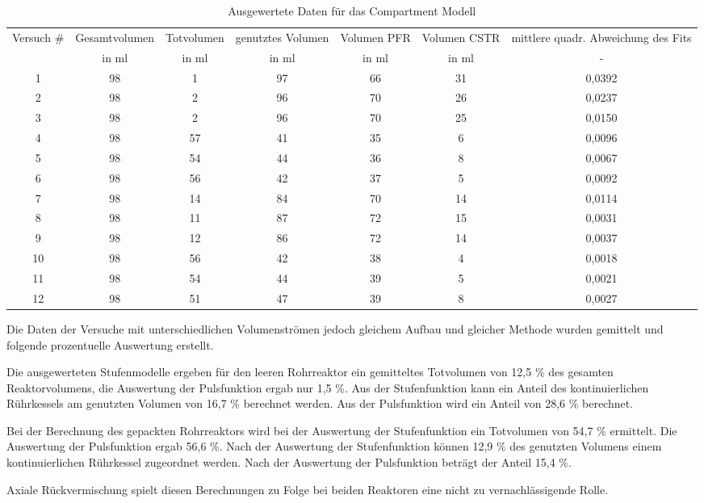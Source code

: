 \documentclass[12pt,liststotoc]{report}
\begin{document}
\begin{landscape}

\begin{table}[C]
\centering
\caption{Ausgewertete Daten für das Compartment Modell}
\begin{tabular}{ccccccc}
\toprule 
Versuch $\#$ & Gesamtvolumen & Totvolumen & genutztes Volumen & Volumen PFR & Volumen CSTR & mittlere quadr. Abweichung des Fits \\
& in ml & in  ml & in ml & in ml & in ml & -\\
\midrule
1 & 98 & 1 & 97 & 66 & 31 & 0,0392 \\
2 & 98 & 2 & 96 & 70 & 26 & 0,0237 \\
3 & 98 & 2 & 96 & 70 & 25 & 0,0150\\
4 & 98 & 57 & 41 & 35 & 6 & 0,0096\\
5 & 98 & 54 & 44 & 36 & 8 & 0,0067\\
6 & 98 & 56 & 42 & 37 & 5 & 0,0092\\
7 & 98 & 14 & 84 & 70 & 14 & 0,0114\\
8 & 98 & 11 & 87 & 72 & 15 & 0,0031\\
9 & 98 & 12 & 86 & 72 & 14 & 0,0037\\
10 & 98 & 56 & 42 & 38 & 4 & 0,0018\\
11 & 98 & 54 & 44 & 39 & 5 & 0,0021\\
12 & 98 & 51 & 47 & 39 & 8 & 0,0027\\
\bottomrule
\end{tabular}
\label{tab:compartment}
\end{table}
\noindent

\end{landscape}



\par Die Daten der Versuche mit unterschiedlichen Volumenströmen jedoch gleichem Aufbau und gleicher Methode wurden gemittelt und folgende prozentuelle Auswertung erstellt.
\par Die ausgewerteten Stufenmodelle ergeben für den leeren Rohrreaktor ein gemitteltes Totvolumen von 12,5 \% des gesamten Reaktorvolumens, die Auswertung der Pulsfunktion ergab nur 1,5 \%. Aus der Stufenfunktion kann ein Anteil des kontinuierlichen Rührkessels am genutzten Volumen von 16,7 \% berechnet werden. Aus der Pulsfunktion wird ein Anteil von 28,6 \% berechnet.
\par Bei der Berechnung des gepackten Rohrreaktors wird bei der Auswertung der Stufenfunktion ein Totvolumen von 54,7 \% ermittelt. Die Auswertung der Pulsfunktion ergab 56,6 \%. Nach der Auswertung der Stufenfunktion können 12,9 \% des genutzten Volumens einem kontinuierlichen Rührkessel zugeordnet werden. Nach der Auswertung der Pulsfunktion beträgt der Anteil 15,4 \%.
\par Axiale Rückvermischung spielt diesen Berechnungen zu Folge bei beiden Reaktoren eine nicht zu vernachlässigende Rolle.
\end{document}
